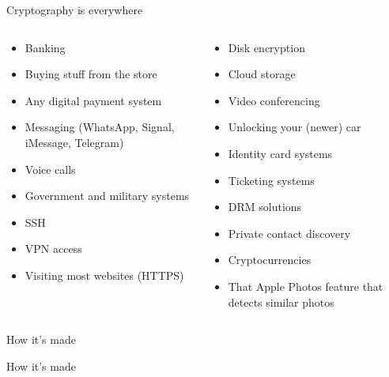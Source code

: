 \documentclass[aspectratio=169, lualatex, handout]{beamer}
\begin{document}
\begin{frame}{Cryptography is everywhere}
	\begin{columns}[c]
		\begin{column}{0.5\textwidth}
			\begin{itemize}[<+->]
				\item Banking
				\item Buying stuff from the store
				\item Any digital payment system
				\item Messaging (WhatsApp, Signal, iMessage, Telegram)
				\item Voice calls
				\item Government and military systems
				\item SSH
				\item VPN access
				\item Visiting most websites (HTTPS)
			\end{itemize}
		\end{column}
		\begin{column}{0.5\textwidth}
			\begin{itemize}[<+->]
				\item Disk encryption
				\item Cloud storage
				\item Video conferencing
				\item Unlocking your (newer) car
				\item Identity card systems
				\item Ticketing systems
				\item DRM solutions
				\item Private contact discovery
				\item Cryptocurrencies
				\item That Apple Photos feature that detects similar photos
			\end{itemize}
		\end{column}
	\end{columns}
\end{frame}

\begin{frame}{How it's made}
\end{frame}

\begin{frame}{How it's made}
	\begin{center}
	\end{center}
\end{frame}
\end{document}
